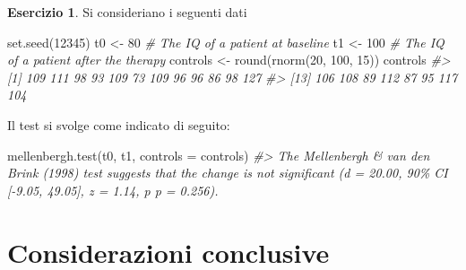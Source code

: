 \documentclass[
  11pt,
]{krantz}
\makeatletter
\newenvironment{Shaded}{\begin{snugshade}}{\end{snugshade}}
\newcommand{\AttributeTok}[1]{\textcolor[rgb]{0.61,0.61,0.61}{#1}}
\newcommand{\CommentTok}[1]{\textcolor[rgb]{0.37,0.37,0.37}{\textit{#1}}}
\newcommand{\DecValTok}[1]{\textcolor[rgb]{0.06,0.06,0.06}{#1}}
\newcommand{\FunctionTok}[1]{\textcolor[rgb]{0,0,0}{#1}}
\newcommand{\NormalTok}[1]{#1}
\newcommand{\OtherTok}[1]{\textcolor[rgb]{0.37,0.37,0.37}{#1}}
\newenvironment{kframe}{%
\medskip{}
\setlength{\fboxsep}{.8em}
 \def\at@end@of@kframe{}%
 \ifinner\ifhmode%
  \def\at@end@of@kframe{\end{minipage}}%
  \begin{minipage}{\columnwidth}%
 \fi\fi%
 \def\FrameCommand##1{\hskip\@totalleftmargin \hskip-\fboxsep
 \colorbox{shadecolor}{##1}\hskip-\fboxsep
     \hskip-\linewidth \hskip-\@totalleftmargin \hskip\columnwidth}%
 \MakeFramed {\advance\hsize-\width
   \@totalleftmargin\z@ \linewidth\hsize
   \@setminipage}}%
 {\par\unskip\endMakeFramed%
 \at@end@of@kframe}
\renewenvironment{Shaded}{\begin{kframe}}{\end{kframe}}
\theoremstyle{definition}
\theoremstyle{definition}
\theoremstyle{definition}
\newtheorem{exercise}{Esercizio}[chapter]
\theoremstyle{definition}
\theoremstyle{remark}
\makeatother
\begin{document}
\begin{exercise}

Si consideriano i seguenti dati

\begin{Shaded}
\begin{Highlighting}[]
\FunctionTok{set.seed}\NormalTok{(}\DecValTok{12345}\NormalTok{)}
\NormalTok{t0 }\OtherTok{\textless{}{-}} \DecValTok{80} \CommentTok{\# The IQ of a patient at baseline}
\NormalTok{t1 }\OtherTok{\textless{}{-}} \DecValTok{100} \CommentTok{\# The IQ of a patient after the therapy}
\NormalTok{controls }\OtherTok{\textless{}{-}} \FunctionTok{round}\NormalTok{(}\FunctionTok{rnorm}\NormalTok{(}\DecValTok{20}\NormalTok{, }\DecValTok{100}\NormalTok{, }\DecValTok{15}\NormalTok{))}
\NormalTok{controls}
\CommentTok{\#\textgreater{}  [1] 109 111  98  93 109  73 109  96  96  86  98 127}
\CommentTok{\#\textgreater{} [13] 106 108  89 112  87  95 117 104}
\end{Highlighting}
\end{Shaded}

Il test si svolge come indicato di seguito:

\begin{Shaded}
\begin{Highlighting}[]
\FunctionTok{mellenbergh.test}\NormalTok{(t0, t1, }\AttributeTok{controls =}\NormalTok{ controls)}
\CommentTok{\#\textgreater{} The Mellenbergh \& van den Brink (1998) test suggests that the change is not significant (d = 20.00, 90\% CI [{-}9.05, 49.05], z = 1.14, p p = 0.256).}
\end{Highlighting}
\end{Shaded}

\end{exercise}

\hypertarget{considerazioni-conclusive}{%
\section*{Considerazioni conclusive}\label{considerazioni-conclusive}}
\end{document}
